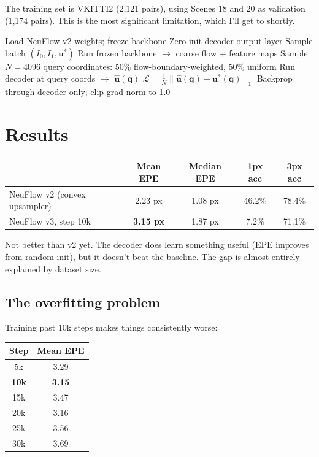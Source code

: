 \documentclass[11pt,a4paper]{article}
\begin{document}
The training set is VKITTI2 (2,121 pairs), using Scenes 18 and 20 as validation (1,174 pairs). This is the most significant limitation, which I'll get to shortly.

\begin{algorithm}[H]
\caption{Training loop (simplified)}
\begin{algorithmic}[1]
\State Load NeuFlow v2 weights; freeze backbone
\State Zero-init decoder output layer
  \State Sample batch $(I_0, I_1, \mathbf{u}^*)$
  \State Run frozen backbone $\to$ coarse flow + feature maps
  \State Sample $N=4096$ query coordinates: 50\% flow-boundary-weighted, 50\% uniform
  \State Run decoder at query coords $\to$ $\hat{\mathbf{u}}(\mathbf{q})$
  \State $\mathcal{L} = \frac{1}{N}\|\hat{\mathbf{u}}(\mathbf{q}) - \mathbf{u}^*(\mathbf{q})\|_1$
  \State Backprop through decoder only; clip grad norm to 1.0
\EndFor
\end{algorithmic}
\end{algorithm}

\section{Results}

\begin{center}
\begin{tabular}{lcccc}
\toprule
& \textbf{Mean EPE} & \textbf{Median EPE} & \textbf{1px acc} & \textbf{3px acc} \\
\midrule
NeuFlow v2 (convex upsampler) & 2.23 px & 1.08 px & 46.2\% & 78.4\% \\
NeuFlow v3, step 10k & \textbf{3.15 px} & 1.87 px & 7.2\% & 71.1\% \\
\bottomrule
\end{tabular}
\end{center}

Not better than v2 yet. The decoder does learn something useful (EPE improves from random init), but it doesn't beat the baseline. The gap is almost entirely explained by dataset size.

\subsection{The overfitting problem}

Training past 10k steps makes things consistently worse:

\begin{center}
\begin{tabular}{cc}
\toprule Step & Mean EPE \\ \midrule
5k & 3.29 \\ \textbf{10k} & \textbf{3.15} \\ 15k & 3.47 \\ 20k & 3.16 \\ 25k & 3.56 \\ 30k & 3.69 \\
\bottomrule
\end{tabular}
\end{center}
\end{document}
